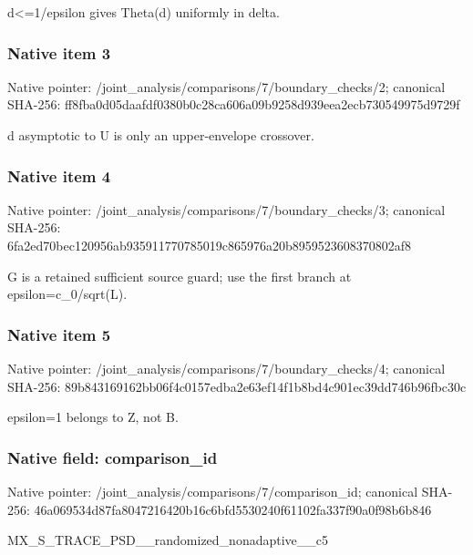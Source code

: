 \documentclass[10pt,a4paper]{article}
\begin{document}
\begingroup\raggedright\sloppy d<=\allowbreak{}1/\allowbreak{}epsilon gives Theta(d) uniformly in delta.\par\endgroup

\subsubsection{Native item 3}
Native pointer: /joint\_\allowbreak{}analysis/comparisons/7/boundary\_\allowbreak{}checks/2; canonical SHA-256: ff8fba0d05daafdf0380b0c28ca606a09b9258d939eea2ecb730549975d9729f

\begingroup\raggedright\sloppy d asymptotic to U is only an upper-envelope crossover.\par\endgroup

\subsubsection{Native item 4}
Native pointer: /joint\_\allowbreak{}analysis/comparisons/7/boundary\_\allowbreak{}checks/3; canonical SHA-256: 6fa2ed70bec120956ab935911770785019c865976a20b8959523608370802af8

\begingroup\raggedright\sloppy G is a retained sufficient source guard;\allowbreak{} use the first branch at epsilon=\allowbreak{}c\_\allowbreak{}0/\allowbreak{}sqrt(L).\par\endgroup

\subsubsection{Native item 5}
Native pointer: /joint\_\allowbreak{}analysis/comparisons/7/boundary\_\allowbreak{}checks/4; canonical SHA-256: 89b843169162bb06f4c0157edba2e63ef14f1b8bd4c901ec39dd746b96fbc30c

\begingroup\raggedright\sloppy epsilon=\allowbreak{}1 belongs to Z,\allowbreak{} not B.\par\endgroup

\subsubsection{Native field: comparison\_\allowbreak{}id}
Native pointer: /joint\_\allowbreak{}analysis/comparisons/7/comparison\_\allowbreak{}id; canonical SHA-256: 46a069534d87fa8047216420b16c6bfd5530240f61102fa337f90a0f98b6b846

\begingroup\raggedright\sloppy MX\_\allowbreak{}S\_\allowbreak{}TRACE\_\allowbreak{}PSD\_\allowbreak{}\_\allowbreak{}randomized\_\allowbreak{}nonadaptive\_\allowbreak{}\_\allowbreak{}c5\par\endgroup
\end{document}
